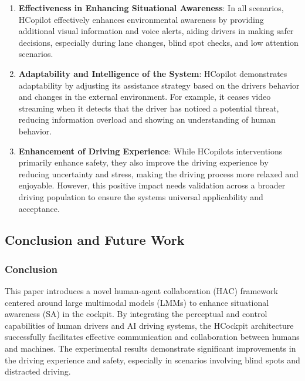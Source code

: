 \documentclass[
]{article}
\begin{document}
\begin{enumerate}
\def\labelenumi{\arabic{enumi}.}
\item
  \textbf{Effectiveness in Enhancing Situational Awareness}: In all
  scenarios, HCopilot effectively enhances environmental awareness by
  providing additional visual information and voice alerts, aiding
  drivers in making safer decisions, especially during lane changes,
  blind spot checks, and low attention scenarios.
\item
  \textbf{Adaptability and Intelligence of the System}: HCopilot
  demonstrates adaptability by adjusting its assistance strategy based
  on the driver\textquotesingle s behavior and changes in the external
  environment. For example, it ceases video streaming when it detects
  that the driver has noticed a potential threat, reducing information
  overload and showing an understanding of human behavior.
\item
  \textbf{Enhancement of Driving Experience}: While
  HCopilot\textquotesingle s interventions primarily enhance safety,
  they also improve the driving experience by reducing uncertainty and
  stress, making the driving process more relaxed and enjoyable.
  However, this positive impact needs validation across a broader
  driving population to ensure the system\textquotesingle s universal
  applicability and acceptance.
\end{enumerate}

\subsection{Conclusion and Future
Work}\label{conclusion-and-future-work}

\subsubsection{Conclusion}\label{conclusion}

This paper introduces a novel human-agent collaboration (HAC) framework
centered around large multimodal models (LMMs) to enhance situational
awareness (SA) in the cockpit. By integrating the perceptual and control
capabilities of human drivers and AI driving systems, the HCockpit
architecture successfully facilitates effective communication and
collaboration between humans and machines. The experimental results
demonstrate significant improvements in the driving experience and
safety, especially in scenarios involving blind spots and distracted
driving.
\end{document}
